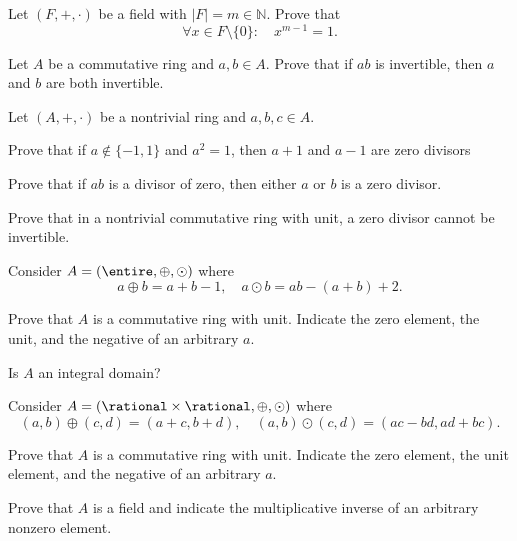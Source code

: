 \documentclass[
    11pt,a4paper,
]{exam}
\begin{document}
\begin{questions}
\begin{ejercicio}
Let $(F,+,\cdot)$ be a field with $|F|=m\in \mathbb{N}$. Prove that
\begin{equation}
\forall x\in F\setminus \{0\}:\quad
x^{m-1} = 1.
\end{equation}
\end{ejercicio}

\begin{ejercicio}
Let $A$ be a commutative ring and $a,b\in A$. Prove that if $ab$ is invertible, then $a$ and $b$ are both invertible.
\end{ejercicio}


\begin{ejercicio}
Let $(A,+,\cdot)$ be a nontrivial ring and $a,b,c\in A$.
\begin{my_enumerate}
\item Prove that if $a\notin \{-1,1\}$ and $a^2=1$, then $a+1$ and $a-1$ are zero divisors
\item Prove that if $ab$ is a divisor of zero, then either $a$ or $b$ is a zero divisor.
\end{my_enumerate}
\end{ejercicio}

\begin{ejercicio}
Prove that in a nontrivial commutative ring with unit, a zero divisor cannot be invertible. 
\end{ejercicio}



\begin{ejercicio}
Consider $A = (\entire, \oplus, \odot)$ where
$$
a\oplus b = a+b-1,
\quad
a\odot b = ab - (a+b) +2.
$$
\begin{my_enumerate}
\item Prove that $A$ is a commutative ring with unit. Indicate the zero element, the unit, and the negative of an arbitrary $a$.
\item Is $A$ an integral domain?
\end{my_enumerate}
\end{ejercicio}

\begin{ejercicio}
Consider $A = (\rational \times \rational, \oplus, \odot)$ where
$$
(a,b)\oplus (c,d) = (a+c,b+d),
\quad
(a,b)\odot (c,d) = (ac-bd,ad+bc).
$$
\begin{my_enumerate}
\item Prove that $A$ is a commutative ring with unit. Indicate the zero element, the unit element, and the negative of an arbitrary $a$.
\item Prove that $A$ is a field and indicate the multiplicative inverse of an arbitrary nonzero element.
\end{my_enumerate}
\end{ejercicio}


\end{questions}
\end{document}
